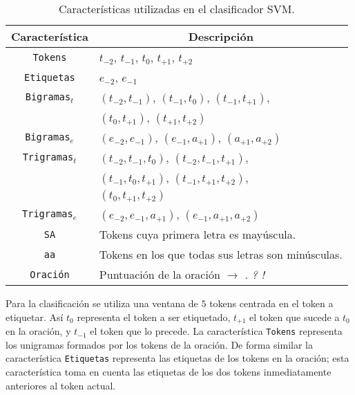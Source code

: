 \documentclass[runningheads,a4paper]{llncs}
\begin{document}
\begin{table}[ht]
 	\renewcommand{\arraystretch}{1.3}
	\renewcommand{\tabcolsep}{3pt}
	\caption{Características utilizadas en el clasificador SVM.}
	\label{table:featuresSVM}
	\centering
	\begin{tabular}{c l}
		\hline\hline
		\multicolumn{1}{c}{\textbf{Característica}} & \multicolumn{1}{c}{\textbf{Descripción}} \\
		\hline
		\texttt{Tokens} & $t_{-2}$, $t_{-1}$, $t_{0}$, $t_{+1}$, $t_{+2}$ \\
		\texttt{Etiquetas} &  $e_{-2}$, $e_{-1}$ \\
		\texttt{Bigramas$_{t}$} & $(t_{-2},t_{-1})$, $(t_{-1},t_{0})$, $(t_{-1},t_{+1})$, \\
			& $(t_{0},t_{+1})$, $(t_{+1},t_{+2})$ \\
		\texttt{Bigramas$_{e}$} & $(e_{-2},e_{-1})$, $(e_{-1},a_{+1})$, $(a_{+1},a_{+2})$ \\
		\texttt{Trigramas$_{t}$} & $(t_{-2},t_{-1},t_{0})$, $(t_{-2},t_{-1},t_{+1})$, \\
			& $(t_{-1},t_{0},t_{+1})$, $(t_{-1},t_{+1},t_{+2})$, \\
			& $(t_{0},t_{+1},t_{+2})$ \\
		\texttt{Trigramas$_{e}$} & $(e_{-2},e_{-1},a_{+1})$, $(e_{-1},a_{+1},a_{+2})$ \\
		\texttt{SA} & Tokens cuya primera letra es mayúscula. \\
		\texttt{aa} & Tokens en los que todas sus letras son minúsculas. \\
		\texttt{Oraci\'on} & Puntuación de la oración $\rightarrow$ \emph{.} \emph{?} \emph{!} \\
		\hline
	\end{tabular}
\end{table}

Para la clasificación se utiliza una ventana de $5$ tokens centrada en el token a etiquetar. Así $t_{0}$ representa el token a ser etiquetado, $t_{+1}$ el token que sucede a $t_{0}$ en la oración, y $t_{-1}$ el token que lo precede. La característica \texttt{\small Tokens} representa los unigramas formados por los tokens de la oración. De forma similar la característica \texttt{\small Etiquetas} representa las etiquetas de los tokens en la oración; esta característica toma en cuenta las etiquetas de los dos tokens inmediatamente anteriores al token actual.
\end{document}
